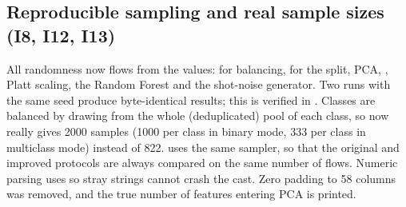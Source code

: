 \subsection{Reproducible sampling and real sample sizes (I8, I12, I13)}
All randomness now flows from the  values:  for
balancing,  for the split, PCA, , Platt scaling, the
Random Forest and the shot-noise generator. Two runs with the same seed produce byte-identical
results; this is verified in . Classes are
balanced by drawing from the whole (deduplicated) pool of each class, so  now
really gives 2000 samples (1000 per class in binary mode, 333 per class in multiclass mode)
instead of 822.  uses the same sampler, so that the original and improved protocols
are always compared on the same number of flows. Numeric
parsing uses  so stray strings cannot crash the cast. Zero
padding to 58 columns was removed, and the true number of features entering PCA is printed.
